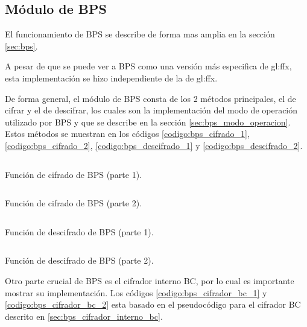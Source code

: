%
%
%

%
\subsection{Módulo de BPS}

El funcionamiento de BPS se describe de forma mas amplia en la sección
\ref{sec:bps}.

A pesar de que se puede ver a BPS como una versión más especifica de
\gls{gl:ffx}, esta implementación se hizo independiente de la de \gls{gl:ffx}.

De forma general, el módulo de BPS consta de los 2 métodos principales, el
de cifrar y el de descifrar, los cuales son la implementación del modo de
operación utilizado por BPS y que se describe en la sección
\ref{sec:bps_modo_operacion}. Estos métodos se muestran en los códigos
\ref{codigo:bps_cifrado_1}, \ref{codigo:bps_cifrado_2},
\ref{codigo:bps_descifrado_1} y \ref{codigo:bps_descifrado_2}.


\begin{listing}
  \inputminted[firstline=77, lastline=116]
    {c++}{../implementaciones/bps/cifrador_BPS.cpp}
  \caption{Función de cifrado de BPS (parte 1).}
  \label{codigo:bps_cifrado_1}
\end{listing}

\begin{listing}
  \inputminted[firstline=116, lastline=156]
    {c++}{../implementaciones/bps/cifrador_BPS.cpp}
  \caption{Función de cifrado de BPS (parte 2).}
  \label{codigo:bps_cifrado_2}
\end{listing}

\begin{listing}
  \inputminted[firstline=158, lastline=198]
    {c++}{../implementaciones/bps/cifrador_BPS.cpp}
  \caption{Función de descifrado de BPS (parte 1).}
  \label{codigo:bps_descifrado_1}
\end{listing}

\begin{listing}
  \inputminted[firstline=198, lastline=250]
    {c++}{../implementaciones/bps/cifrador_BPS.cpp}
  \caption{Función de descifrado de BPS (parte 2).}
  \label{codigo:bps_descifrado_2}
\end{listing}

Otro parte crucial de BPS es el cifrador interno BC, por lo cual es importante
mostrar su implementación. Los códigos \ref{codigo:bps_cifrador_bc_1} y
\ref{codigo:bps_cifrador_bc_2} esta basado en el pseudocódigo para el cifrador
BC descrito en \ref{sec:bps_cifrador_interno_bc}.

